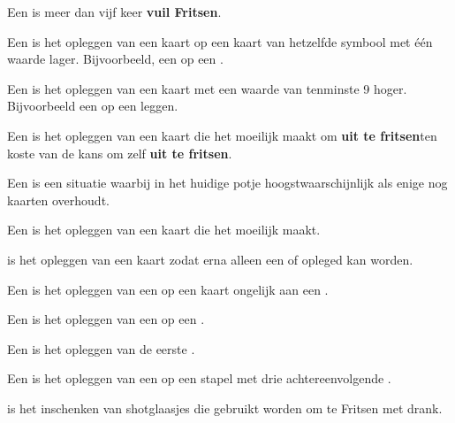 
\item Een  is meer dan vijf keer \textbf{vuil Fritsen}\footnotemark[2].

\item Een  is het opleggen van een kaart op een kaart van hetzelfde symbool met \'e\'en waarde lager. Bijvoorbeeld, een  op een .

\item Een  is het opleggen van een kaart met een waarde van tenminste 9 hoger. Bijvoorbeeld een  op een  leggen.

\item Een  is het opleggen van een kaart die het \andereSpelers moeilijk maakt om \textbf{uit te fritsen}\footnotemark[3] ten koste van de kans om zelf \textbf{uit te fritsen}\footnotemark[3].

\item Een  is een situatie waarbij \eenSpeler in het huidige potje hoogstwaarschijnlijk als enige nog kaarten overhoudt.

\item Een  is het opleggen van een kaart die het \andereSpelers moeilijk maakt.

\item {} is het opleggen van een kaart zodat erna alleen een  of  opleged kan worden.

\item Een  is het opleggen van een  op een kaart ongelijk aan een .

\item Een  is het opleggen van een  op een .

\item Een  is het opleggen van de eerste .

\item Een  is het opleggen van een  op een stapel met drie achtereenvolgende .

\item {} is het inschenken van shotglaasjes die gebruikt worden om te Fritsen met drank.

